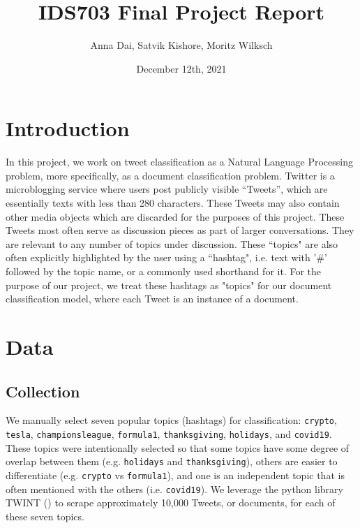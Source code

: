 \documentclass[11pt]{article}
\title{\vspace{-1.5cm}IDS703 Final Project Report}
\author{Anna Dai, Satvik Kishore, Moritz Wilksch}
\date{December 12th, 2021}
\begin{document}
\maketitle

\section{Introduction}

In this project, we work on tweet classification as a Natural Language Processing problem, more specifically, as a document classification problem. Twitter is a microblogging service where users post publicly visible ``Tweets'', which are essentially texts with less than 280 characters. These Tweets may also contain other media objects which are discarded for the purposes of this project. These Tweets most often serve as discussion pieces as part of larger conversations. They are relevant to any number of topics under discussion. These ``topics" are also often explicitly highlighted by the user using a ``hashtag", i.e. text with '\#' followed by the topic name, or a commonly used shorthand for it. For the purpose of our project, we treat these hashtags as "topics" for our document classification model, where each Tweet is an instance of a document.

\section{Data}

\subsection{Collection}
We manually select seven popular topics (hashtags) for classification: \texttt{crypto}, \texttt{tesla}, \texttt{championsleague}, \texttt{formula1}, \texttt{thanksgiving}, \texttt{holidays}, and \texttt{covid19}. These topics were intentionally selected so that some topics have some degree of overlap between them (e.g. \texttt{holidays} and \texttt{thanksgiving}), others are easier to differentiate (e.g. \texttt{crypto} vs \texttt{formula1}), and one is an independent topic that is often mentioned with the others (i.e. \texttt{covid19}). We leverage the python library TWINT (\cite{twint}) to scrape approximately 10,000 Tweets, or documents, for each of these seven topics.
\end{document}
